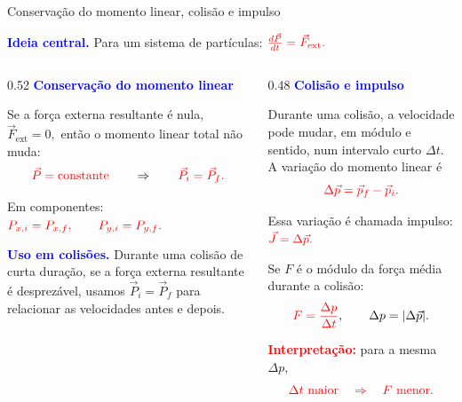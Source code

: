 \documentclass{beamer}
\begin{document}
	
	\begin{frame}{Conservação do momento linear, colisão e impulso}
		\tiny
		
		\textcolor{blue}{\textbf{Ideia central.}}
		Para um sistema de partículas:
		$
		\textcolor{red}{
			\frac{d\vec P}{dt}=\vec F_{\text{ext}}.}
		$
		
		\vspace{0.2cm}
		
		\begin{columns}[T]
			\begin{column}{0.52\textwidth}
				\textcolor{blue}{\textbf{Conservação do momento linear}}
				
				\vspace{0.2cm}
				
				Se a força externa resultante é nula,
				$
				\vec F_{\text{ext}}=0,
				$
				então o momento linear total não muda:
				\[
				\textcolor{red}{\vec P=\text{constante}}
				\qquad \Rightarrow \qquad
				\textcolor{red}{\vec P_i=\vec P_f.}
				\]
				
				Em componentes:
				$
				\textcolor{red}{
					P_{x,i}=P_{x,f}, \qquad
					P_{y,i}=P_{y,f}.}
				$
				
				\vspace{0.2cm}
				
				\textcolor{blue}{\textbf{Uso em colisões.}}
				Durante uma colisão de curta duração, se a força externa resultante é desprezável,
				usamos \(\vec P_i=\vec P_f\) para relacionar as velocidades antes e depois.
			\end{column}
			
			\begin{column}{0.48\textwidth}
				\textcolor{blue}{\textbf{Colisão e impulso}}
				
				\vspace{0.2cm}
				
				Durante uma colisão, a velocidade pode mudar, em módulo e sentido, num intervalo curto \(\Delta t\).
				A variação do momento linear é
				\[
				\textcolor{red}{\Delta \vec p=\vec p_f-\vec p_i.}
				\]
				
				Essa variação é chamada impulso:
				$
				\textcolor{red}{\vec J=\Delta \vec p.}
				$
				
				Se \(F\) é o módulo da força média durante a colisão:
				\[
				\textcolor{red}{
					F=\frac{\Delta p}{\Delta t}},
				\qquad
				\Delta p=|\Delta \vec p|.
				\]
				
				\textcolor{red}{\textbf{Interpretação:}}
				para a mesma \(\Delta p\),
				\[
				\textcolor{red}{
					\Delta t \text{ maior}
					\quad \Rightarrow \quad
					F \text{ menor}.}
				\]
			\end{column}
		\end{columns}
		

\end{frame}
\end{document}
